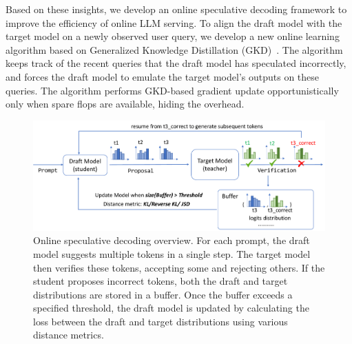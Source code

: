 Based on these insights, we develop an online speculative decoding framework to improve the efficiency of online LLM serving. 
To align the draft model with the target model on a newly observed user query, we develop a new online learning algorithm based on Generalized Knowledge Distillation (GKD)~\citep{gu2023knowledge,agarwal2023gkd}. The algorithm keeps track of the recent queries that the draft model has speculated incorrectly, and forces the draft model to emulate the target model's outputs on these queries. The algorithm performs GKD-based gradient update opportunistically only when spare flops are available, hiding the overhead. 

\begin{figure}[h]       
    \centering
    \label{fig:arch}
    \includegraphics[width=0.8\linewidth]{figures/arch.pdf}
    \caption{Online speculative decoding overview. For each prompt, the draft model suggests multiple tokens in a single step. The target model then verifies these tokens, accepting some and rejecting others. If the student proposes incorrect tokens, both the draft and target distributions are stored in a buffer. Once the buffer exceeds a specified threshold, the draft model is updated by calculating the loss between the draft and target distributions using various distance metrics.}
\end{figure}

